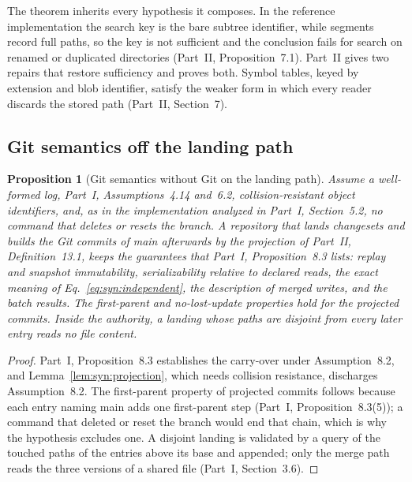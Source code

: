 \documentclass[11pt,letterpaper]{article}
\newtheorem{proposition}[theorem]{Proposition}
\theoremstyle{definition}
\theoremstyle{remark}
\begin{document}
The theorem inherits every hypothesis it composes. In the reference implementation the search key is the bare subtree identifier, while segments record full paths, so the key is not sufficient and the conclusion fails for search on renamed or duplicated directories (Part~II, Proposition~7.1). Part~II gives two repairs that restore sufficiency and proves both. Symbol tables, keyed by extension and blob identifier, satisfy the weaker form in which every reader discards the stored path (Part~II, Section~7).

\subsection{Git semantics off the landing path}

\begin{proposition}[Git semantics without Git on the landing path]
\label{prop:syn:offpath}
Assume a well-formed log, Part~I, Assumptions~4.14 and~6.2, collision-resistant object identifiers, and, as in the implementation analyzed in Part~I, Section~5.2, no command that deletes or resets the branch. A repository that lands changesets and builds the Git commits of main afterwards by the projection of Part~II, Definition~13.1, keeps the guarantees that Part~I, Proposition~8.3 lists: replay and snapshot immutability, serializability relative to declared reads, the exact meaning of Eq.~\eqref{eq:syn:independent}, the description of merged writes, and the batch results. The first-parent and no-lost-update properties hold for the projected commits. Inside the authority, a landing whose paths are disjoint from every later entry reads no file content.
\end{proposition}

\begin{proof}
Part~I, Proposition~8.3 establishes the carry-over under Assumption~8.2, and Lemma~\ref{lem:syn:projection}, which needs collision resistance, discharges Assumption~8.2. The first-parent property of projected commits follows because each entry naming main adds one first-parent step (Part~I, Proposition~8.3(5)); a command that deleted or reset the branch would end that chain, which is why the hypothesis excludes one. A disjoint landing is validated by a query of the touched paths of the entries above its base and appended; only the merge path reads the three versions of a shared file (Part~I, Section~3.6).
\end{proof}
\end{document}
